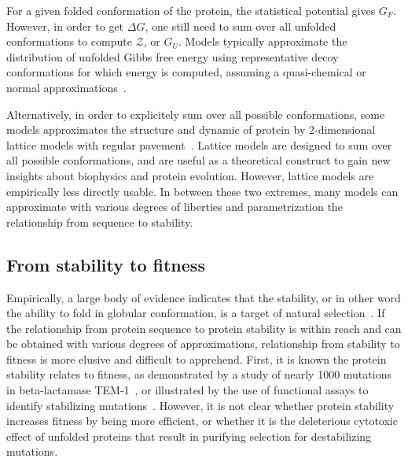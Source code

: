 For a given folded conformation of the protein, the statistical potential gives $G_F$.
However, in order to get $\Delta G$, one still need to sum over all unfolded conformations to compute $\mathcal{Z}$, or $G_U$.
Models typically approximate the distribution of unfolded Gibbs free energy using representative decoy conformations for which energy is computed, assuming a quasi-chemical or normal approximations~\citep{Goldstein2011}.

Alternatively, in order to explicitely sum over all possible conformations, some models approximates the structure and dynamic of protein by 2-dimensional lattice models with regular pavement~\citep{Taverna2002, Noivirt-Brik2009}.
Lattice models are designed to sum over all possible conformations, and are useful as a theoretical construct to gain new insights about biophysics and protein evolution.
However, lattice models are empirically less directly usable.
In between these two extremes, many models can approximate with various degrees of liberties and parametrization the relationship from sequence to stability.


\subsection{From stability to fitness}

Empirically, a large body of evidence indicates that the stability, or in other word the ability to fold in globular conformation, is a target of natural selection~\citep{Sikosek2014}.
If the relationship from protein sequence to protein stability is within reach and can be obtained with various degrees of approximations, relationship from stability to fitness is more elusive and difficult to apprehend.
First, it is known the protein stability relates to fitness, as demonstrated by a study of nearly 1000 mutations in beta-lactamase TEM-1~\citep{Jacquier2013}, or illustrated by the use of functional assays to identify stabilizing mutations~\citep{Araya2012}.
However, it is not clear whether protein stability increases fitness by being more efficient, or whether it is the deleterious cytotoxic effect of unfolded proteins that result in purifying selection for destabilizing mutations.

